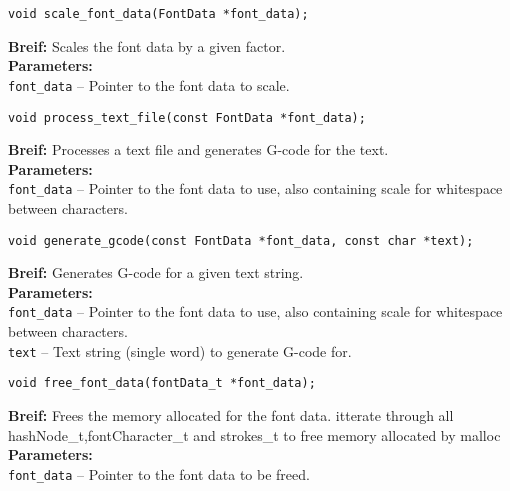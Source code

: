         \begin{verbatim}
void scale_font_data(FontData *font_data);
        \end{verbatim}
        \textbf{Breif:} Scales the font data by a given factor. \\
        \textbf{Parameters:} \\
        \hspace*{1cm}\texttt{font\_data} -- Pointer to the font data to scale. \\

        
        \begin{verbatim}
void process_text_file(const FontData *font_data);
        \end{verbatim}
        \textbf{Breif:} Processes a text file and generates G-code for the text. \\
        \textbf{Parameters:} \\
        \hspace*{1cm}\texttt{font\_data} -- Pointer to the font data to use, also containing scale for whitespace between characters. \\[1em]
        
        \begin{verbatim}
void generate_gcode(const FontData *font_data, const char *text);
        \end{verbatim}
        \textbf{Breif:} Generates G-code for a given text string. \\
        \textbf{Parameters:} \\
        \hspace*{1cm}\texttt{font\_data} -- Pointer to the font data to use, also containing scale for whitespace between characters. \\
        \hspace*{1cm}\texttt{text} -- Text string (single word) to generate G-code for.

        \begin{verbatim}
void free_font_data(fontData_t *font_data);
        \end{verbatim}
        \textbf{Breif:} Frees the memory allocated for the font data. itterate through all hashNode\_t,fontCharacter\_t and strokes\_t to free memory allocated by malloc\\
        \textbf{Parameters:} \\
        \hspace*{1cm}\texttt{font\_data} -- Pointer to the font data to be freed.